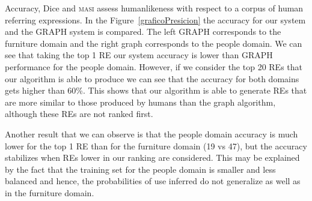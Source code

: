 Accuracy, Dice and \textsc{masi} assess humanlikeness with respect to a corpus of human referring expressions. In the Figure~\ref{graficoPresicion} the accuracy for our system and the GRAPH system is compared. The left GRAPH corresponds to the furniture domain and the right graph corresponds to the people domain. We can see that taking the top 1 RE our system accuracy is lower than GRAPH performance for the people domain. However, if we consider the top 20 REs that our algorithm is able to produce we can see that the accuracy for both domains gets higher than 60\%. This shows that our algorithm is able to generate REs that are more similar to those produced by humans than the graph algorithm, although these REs are not ranked first. 

Another result that we can observe is that the people domain accuracy is much lower for the top 1 RE than for the furniture domain (19 vs 47), but the accuracy stabilizes when REs lower in our ranking are considered. This may be explained by the fact that the training set for the people domain is smaller and less balanced and hence, the probabilities of use inferred do not generalize as well as in the furniture domain. 

